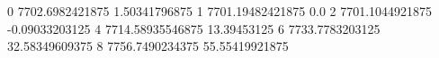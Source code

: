 0 7702.6982421875 1.50341796875
1 7701.19482421875 0.0
2 7701.1044921875 -0.09033203125
4 7714.58935546875 13.39453125
6 7733.7783203125 32.58349609375
8 7756.7490234375 55.55419921875

